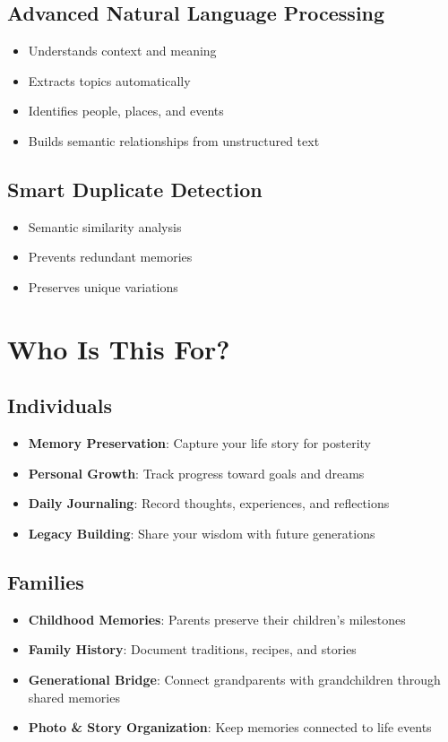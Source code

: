 \documentclass[11pt,letterpaper]{article}
\begin{document}
\subsection{Advanced Natural Language Processing}
\begin{itemize}[leftmargin=*]
    \item Understands context and meaning
    \item Extracts topics automatically
    \item Identifies people, places, and events
    \item Builds semantic relationships from unstructured text
\end{itemize}

\subsection{Smart Duplicate Detection}
\begin{itemize}[leftmargin=*]
    \item Semantic similarity analysis
    \item Prevents redundant memories
    \item Preserves unique variations
\end{itemize}

\newpage
\section{Who Is This For?}

\subsection{Individuals}
\begin{itemize}[leftmargin=*]
    \item \textbf{Memory Preservation}: Capture your life story for posterity
    \item \textbf{Personal Growth}: Track progress toward goals and dreams
    \item \textbf{Daily Journaling}: Record thoughts, experiences, and reflections
    \item \textbf{Legacy Building}: Share your wisdom with future generations
\end{itemize}

\subsection{Families}
\begin{itemize}[leftmargin=*]
    \item \textbf{Childhood Memories}: Parents preserve their children's milestones
    \item \textbf{Family History}: Document traditions, recipes, and stories
    \item \textbf{Generational Bridge}: Connect grandparents with grandchildren through shared memories
    \item \textbf{Photo \& Story Organization}: Keep memories connected to life events
\end{itemize}
\end{document}
